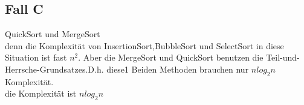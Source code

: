 \documentclass{article}
\begin{document}
\subsection{Fall C}
QuickSort und MergeSort
\\denn die Komplexität von InsertionSort,BubbleSort und SelectSort in diese Situation ist fast $n^2$. Aber die MergeSort und QuickSort benutzen die Teil-und-Herrsche-Grundsatzes.D.h. diese1 Beiden Methoden brauchen nur $nlog_2n$ Komplexität.
\\die Komplexität ist $nlog_2n$
\end{document}
